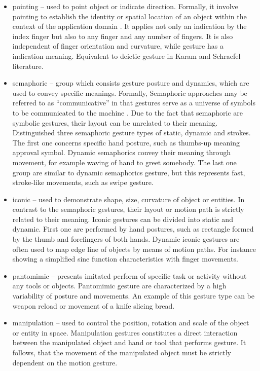 \begin{itemize}

\item pointing -- used to point object or indicate direction. Formally, it involve pointing to establish the identity or spatial location of an object within the context of the application domain \cite{Karam05ataxonomy}. It applies not only an indication by the index finger but also to any finger and any number of fingers. It is also independent of finger orientation and curvature, while gesture has a indication meaning. Equivalent to deictic gesture in Karam and Schraefel literature.

\item semaphoric -- group which consists gesture posture and dynamics, which are used to convey specific meanings. Formally, Semaphoric approaches may be referred to as ``communicative'' in that gestures serve as a universe of symbols to be communicated to the machine \cite{Quek:2002:MHD:568513.568514}. Due to the fact that semaphoric are symbolic gestures, their layout can be unrelated to their meaning. Distinguished three semaphoric gesture types of static, dynamic and strokes. The first one concerns specific hand posture, such as thumbs-up meaning approval symbol.
Dynamic semaphorics convey their meaning through movement, for example waving of hand to greet somebody. The last one group are similar to dynamic semaphorics gesture, but this represents fast, stroke-like movements, such as swipe gesture.

\item iconic -- used to demonstrate shape, size, curvature of object or entities. In contrast to the semaphoric gestures, their layout or motion path is strictly related to their meaning. Iconic gestures can be divided into static and dynamic. First one are performed by hand postures, such as rectangle formed by the thumb and forefingers of both hands. Dynamic iconic gestures are often used to map edge line of objects by means of motion paths. For instance showing a simplified sine function characteristics with finger movements.

\item pantomimic -- presents imitated perform of specific task or activity without  any tools or objects. Pantomimic gesture are characterized by a high variability of posture and movements. An example of this gesture type can be weapon reload or movement of a knife slicing bread.

\item manipulation -- used to control the position, rotation and scale of the object or entity in space. Manipulation gestures constitutes a direct interaction between the manipulated object and hand or tool that performs gesture. It follows, that the movement of the manipulated object must be strictly dependent on the motion gesture.
\end{itemize}


